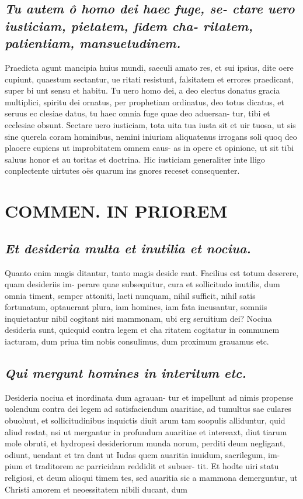 \documentclass{article}
\begin{document}
\begin{pages}
\subsection*{\textit{Tu autem ô homo dei haec fuge, se- ctare uero iusticiam, pietatem, fidem cha- ritatem, patientiam, mansuetudinem. }}\pstart Praedicta agunt mancipia huius mundi, saeculi amato res, et sui ipsius, dite oere cupiunt, quaestum sectantur, ue ritati resistunt, falsitatem et errores praedicant, super bi unt sensu et habitu. Tu uero homo dei, a deo electus donatus gracia multiplici, spiritu dei ornatus, per prophetiam ordinatus, deo totus dicatus, et seruus ec clesiae datus, tu haec omnia fuge quae deo aduersan- tur, tibi et ecclesiae obsunt. Sectare uero iusticiam, tota uita tua iusta sit et uir tuosa, ut sis sine querela coram hominibus, nemini iniuriam aliquatenus irrogans soli quoq deo plaoere cupiens ut improbitatem omnem caus- as in opere et opinione, ut sit tibi saluus honor et au toritas et doctrina. Hic iusticiam generaliter inte lligo conplectente uirtutes oës quarum ins gnores receset consequenter.  \pend
\section*{COMMEN. IN PRIOREM }
\marginpar{[ p.168 ]}
{}
\subsection*{\textit{Et desideria multa et inutilia et nociua. }}\pstart Quanto enim magis ditantur, tanto magis deside rant. Facilius est totum deserere, quam desideriis im- perare quae subsequitur, cura et sollicitudo inutilis, dum omnia timent, semper attoniti, laeti nunquam, nihil sufficit, nihil satis fortunatum, optauerant plura, iam homines, iam fata incusantur, somniis inquietantur nibil cogitant nisi mammonam, ubi erg seruitium dei? Nociua desideria sunt, quicquid contra legem et cha ritatem cogitatur in communem iacturam, dum priua tim nobis consulimus, dum proximum grauamus etc.  \pend
{}
{}
\subsection*{\textit{Qui mergunt homines in interitum etc. }}\pstart Desideria nociua et inordinata dum agrauan- tur et impellunt ad nimis propense uolendum contra dei legem ad satisfaciendum auaritiae, ad tumultus sae culares obuoluut, et sollicitudinibus inquictis diuit arum tam soopulis alliduntur, quid aliud restat, nsi ut mergantur in profundum auaritiae et intereaxt, diut tiarum mole obruti, et hydropesi desideriorum munda norum, perditi deum negligant, odiunt, uendant et tra dant ut Iudas quem auaritia inuidum, sacrilegum, im- pium et traditorem ac parricidam reddidit et subuer- tit. Et hodte uiri statu religiosi, et deum alioqui timem tes, sed auaritia sic a mammona demerguntur, ut Christi amorem et neoessitatem nibili ducant, dum  \pend

\end{pages}
\end{document}
